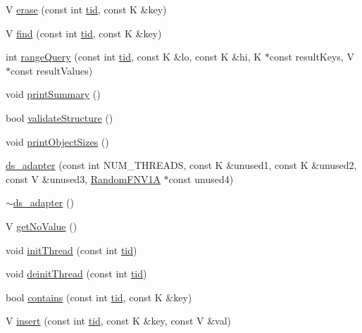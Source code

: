 \begin{DoxyCompactItemize}
\item 
V \hyperlink{classds__adapter_a1bf459e8449df93cc738a644aeffdcfb}{erase} (const int \hyperlink{microbench_2main_8cpp_a9ca9869868fe7e7a38a921cc7de4103f}{tid}, const K \&key)
\item 
V \hyperlink{classds__adapter_a0109b0d011810f687c9e9273eb1d1bc8}{find} (const int \hyperlink{microbench_2main_8cpp_a9ca9869868fe7e7a38a921cc7de4103f}{tid}, const K \&key)
\item 
int \hyperlink{classds__adapter_a23a9c8db5425e98a93d647df1c6c23dd}{range\+Query} (const int \hyperlink{microbench_2main_8cpp_a9ca9869868fe7e7a38a921cc7de4103f}{tid}, const K \&lo, const K \&hi, K $\ast$const result\+Keys, V $\ast$const result\+Values)
\item 
void \hyperlink{classds__adapter_aac97293215557665d2ef1e1a0d06fcfd}{print\+Summary} ()
\item 
bool \hyperlink{classds__adapter_ae50fe8a8683c0278cdd4c45e1405860d}{validate\+Structure} ()
\item 
void \hyperlink{classds__adapter_a33b13b7059a8c0345fb59a324dc3a691}{print\+Object\+Sizes} ()
\item 
\hyperlink{classds__adapter_ab37964787a66459a325cf75ac91da4e8}{ds\+\_\+adapter} (const int N\+U\+M\+\_\+\+T\+H\+R\+E\+A\+DS, const K \&unused1, const K \&unused2, const V \&unused3, \hyperlink{classRandomFNV1A}{Random\+F\+N\+V1A} $\ast$const unused4)
\item 
\hyperlink{classds__adapter_a366f46dd39d59f2d4a147589f5fd98e3}{$\sim$ds\+\_\+adapter} ()
\item 
V \hyperlink{classds__adapter_a9e1e4aec136b351d1a6820d70484a6c5}{get\+No\+Value} ()
\item 
void \hyperlink{classds__adapter_a3733f6a6b57312b1b5e4fb5181d82a0b}{init\+Thread} (const int \hyperlink{microbench_2main_8cpp_a9ca9869868fe7e7a38a921cc7de4103f}{tid})
\item 
void \hyperlink{classds__adapter_a173ca48b19fc1dc346159ea582c690cd}{deinit\+Thread} (const int \hyperlink{microbench_2main_8cpp_a9ca9869868fe7e7a38a921cc7de4103f}{tid})
\item 
bool \hyperlink{classds__adapter_aecf1899dbe9fae93c72ee2b5549cf6eb}{contains} (const int \hyperlink{microbench_2main_8cpp_a9ca9869868fe7e7a38a921cc7de4103f}{tid}, const K \&key)
\item 
V \hyperlink{classds__adapter_a6c0fc676d77e30e14946baf325174739}{insert} (const int \hyperlink{microbench_2main_8cpp_a9ca9869868fe7e7a38a921cc7de4103f}{tid}, const K \&key, const V \&val)

\end{DoxyCompactItemize}
